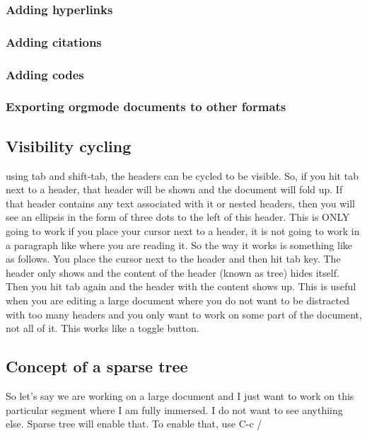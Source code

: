 \documentclass[11pt]{article}
\begin{document}
\subsubsection{Adding hyperlinks}
\label{sec:org044eee0}

\subsubsection{Adding citations}
\label{sec:org9910134}

\subsubsection{Adding codes}
\label{sec:org94c02d0}

\subsubsection{Exporting orgmode documents to other formats}
\label{sec:org3ce5df2}

\subsubsection{}
\label{sec:orga489463}

\subsection{Visibility cycling}
\label{sec:org9f2875c}
using tab and shift-tab, the headers can be cycled to be visible. So, if you hit tab next to a header, that header will be shown and the document will fold up. If that header contains any text associated with it or nested headers, then you will see an ellipsis in the form of three dots to the left of this header. This is ONLY going to work if you place your cursor next to a header, it is not going to work in a paragraph like where you are reading it.
So the way it works is something like as follows. You place the cursor next to the header and then hit tab key. The header only shows and the content of the header (known as tree) hides itself. Then you hit tab again and the header with the content shows up. This is useful when you are editing a large document where you do not want to be distracted with too many headers and you only want to work on some part of the document, not all of it. This works like a toggle button.

\subsection{Concept of a sparse tree}
\label{sec:orgc84963a}
So let's say we are working on a large document and I just want to work on this particular segment where I am fully immersed. I do not want to see anythiing else. Sparse tree will enable that. To enable that, use C-c /
\end{document}
